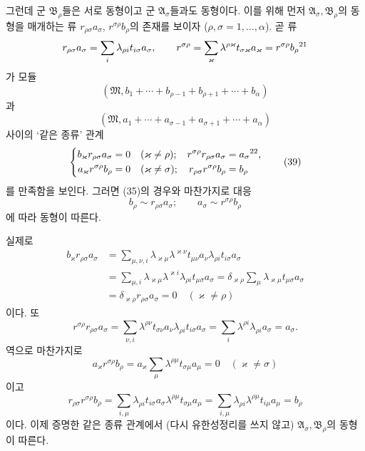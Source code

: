 그런데 군 \(\mathfrak B_\rho\)들은 서로 동형이고 군 \(\mathfrak A_\sigma\)들과도 동형이다. 이를 위해 먼저 \(\mathfrak A_\sigma,\mathfrak B_\rho\)의 동형을 매개하는 류 \(r_{\rho\sigma}a_\sigma\), \(r^{\sigma\rho}b_\rho\)의 존재를 보이자 (\(\rho,\sigma=1,\ldots,\alpha\)). 곧 류
\[
 r_{\rho\sigma}a_\sigma
 =\sum_i\lambda_{\rho i}t_{i\sigma}a_\sigma,\qquad
 r^{\sigma\rho}
 =\sum_\varkappa\lambda^{\rho\varkappa}
  t_{\sigma\varkappa}a_\varkappa
 =r^{\sigma\rho}b_\rho\text{\footnotemark[21]}
\]
가 모듈
\[
 (\mathfrak M,b_1+\cdots+b_{\rho-1}
              +b_{\rho+1}+\cdots+b_\alpha)
\]
과
\[
 (\mathfrak M,a_1+\cdots+a_{\sigma-1}
              +a_{\sigma+1}+\cdots+a_\alpha)
\]
사이의 ‘같은 종류’ 관계
\begin{equation}
\left\{
\begin{aligned}
 b_\varkappa r_{\rho\sigma}a_\sigma&=0
 &&(\varkappa\ne\rho);&
 r^{\sigma\rho}r_{\rho\sigma}a_\sigma
 &=a_\sigma\text{\footnotemark[22]},\\
 a_\varkappa r^{\sigma\rho}b_\rho&=0
 &&(\varkappa\ne\sigma);&
 r_{\rho\sigma}r^{\sigma\rho}b_\rho
 &=b_\rho
\end{aligned}\right.
\tag{39}
\end{equation}
\setcounter{footnote}{22}
를 만족함을 보인다. 그러면 (35)의 경우와 마찬가지로 대응
\begin{equation}
 b_\rho\sim r_{\rho\sigma}a_\sigma;\qquad
 a_\sigma\sim r^{\sigma\rho}b_\rho
\tag{40}
\end{equation}
에 따라 동형이 따른다.

실제로
\[
\begin{aligned}
 b_\varkappa r_{\rho\sigma}a_\sigma
 &=\sum_{\mu,\nu,i}
  \lambda_{\varkappa\mu}\lambda^{\varkappa\nu}
  t_{\mu\nu}a_\nu\lambda_{\rho i}t_{i\sigma}a_\sigma\\
 &=\sum_{\mu,i}
  \lambda_{\varkappa\mu}\lambda^{\varkappa i}
  \lambda_{\rho i}t_{\mu\sigma}a_\sigma
 =\delta_{\varkappa\rho}\sum_\mu
  \lambda_{\varkappa\mu}t_{\mu\sigma}a_\sigma\\
 &=\delta_{\varkappa\rho}r_{\rho\sigma}a_\sigma
 =0\quad(\varkappa\ne\rho)
\end{aligned}
\]
이다. 또
\[
 r^{\sigma\rho}r_{\rho\sigma}a_\sigma
 =\sum_{\nu,i}\lambda^{\rho\nu}t_{\sigma\nu}a_\nu
  \lambda_{\rho i}t_{i\sigma}a_\sigma
 =\sum_i\lambda^{\rho i}\lambda_{\rho i}a_\sigma
 =a_\sigma.
\]
역으로 마찬가지로
\[
 a_\varkappa r^{\sigma\rho}b_\rho
 =a_\varkappa\sum_\mu
  \lambda^{\rho\mu}t_{\sigma\mu}a_\mu
 =0\quad(\varkappa\ne\sigma)
\]
이고
\[
 r_{\rho\sigma}r^{\sigma\rho}b_\rho
 =\sum_{i,\mu}\lambda_{\rho i}t_{i\sigma}a_\sigma
  \lambda^{\rho\mu}t_{\sigma\mu}a_\mu
 =\sum_{i,\mu}\lambda_{\rho i}\lambda^{\rho\mu}
  t_{i\mu}a_\mu=b_\rho
\]
이다. 이제 증명한 같은 종류 관계에서 (다시 유한성정리를 쓰지 않고) \(\mathfrak A_\sigma,\mathfrak B_\rho\)의 동형이 따른다.

